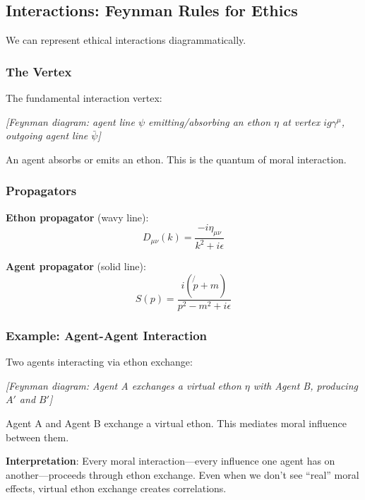 \documentclass[12pt]{article}
\begin{document}
\subsection{Interactions: Feynman Rules for Ethics}

We can represent ethical interactions diagrammatically.

\subsubsection{The Vertex}

The fundamental interaction vertex:

\begin{center}
\emph{[Feynman diagram: agent line $\psi$ emitting/absorbing an ethon $\eta$ at vertex $ig\gamma^\mu$, outgoing agent line $\bar{\psi}$]}
\end{center}

An agent absorbs or emits an ethon. This is the quantum of moral interaction.

\subsubsection{Propagators}

\textbf{Ethon propagator} (wavy line):
\begin{equation}
    D_{\mu\nu}(k) = \frac{-i\eta_{\mu\nu}}{k^2 + i\epsilon}
\end{equation}

\textbf{Agent propagator} (solid line):
\begin{equation}
    S(p) = \frac{i(\not{p} + m)}{p^2 - m^2 + i\epsilon}
\end{equation}

\subsubsection{Example: Agent-Agent Interaction}

Two agents interacting via ethon exchange:

\begin{center}
\emph{[Feynman diagram: Agent A exchanges a virtual ethon $\eta$ with Agent B, producing $A'$ and $B'$]}
\end{center}

Agent A and Agent B exchange a virtual ethon. This mediates moral influence between them.

\textbf{Interpretation}: Every moral interaction---every influence one agent has on another---proceeds through ethon exchange. Even when we don't see ``real'' moral effects, virtual ethon exchange creates correlations.
\end{document}
